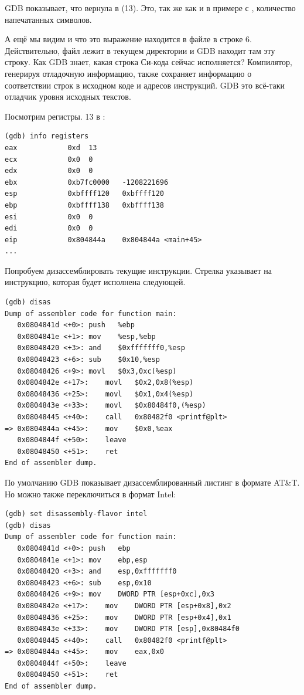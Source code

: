 \ac{GDB} показывает, что вернула \printf в \EAX (13).
Это, так же как и в примере с \olly, количество напечатанных символов.

А ещё мы видим  и что это выражение находится в файле  в строке 6.
Действительно, файл  лежит в текущем директории и \ac{GDB} находит там эту строку.
Как \ac{GDB} знает, какая строка Си-кода сейчас исполняется?
Компилятор, генерируя отладочную информацию, также сохраняет информацию о соответствии строк в исходном коде и адресов инструкций.
GDB это всё-таки отладчик уровня исходных текстов.

Посмотрим регистры.
13 в \EAX:

\begin{lstlisting}
(gdb) info registers
eax            0xd	13
ecx            0x0	0
edx            0x0	0
ebx            0xb7fc0000	-1208221696
esp            0xbffff120	0xbffff120
ebp            0xbffff138	0xbffff138
esi            0x0	0
edi            0x0	0
eip            0x804844a	0x804844a <main+45>
...
\end{lstlisting}

Попробуем дизассемблировать текущие инструкции.
Стрелка указывает на инструкцию, которая будет исполнена следующей.

\begin{lstlisting}
(gdb) disas
Dump of assembler code for function main:
   0x0804841d <+0>:	push   %ebp
   0x0804841e <+1>:	mov    %esp,%ebp
   0x08048420 <+3>:	and    $0xfffffff0,%esp
   0x08048423 <+6>:	sub    $0x10,%esp
   0x08048426 <+9>:	movl   $0x3,0xc(%esp)
   0x0804842e <+17>:	movl   $0x2,0x8(%esp)
   0x08048436 <+25>:	movl   $0x1,0x4(%esp)
   0x0804843e <+33>:	movl   $0x80484f0,(%esp)
   0x08048445 <+40>:	call   0x80482f0 <printf@plt>
=> 0x0804844a <+45>:	mov    $0x0,%eax
   0x0804844f <+50>:	leave  
   0x08048450 <+51>:	ret    
End of assembler dump.
\end{lstlisting}

По умолчанию \ac{GDB} показывает дизассемблированный листинг в формате AT\&T.
Но можно также переключиться в формат Intel:

\begin{lstlisting}
(gdb) set disassembly-flavor intel
(gdb) disas
Dump of assembler code for function main:
   0x0804841d <+0>:	push   ebp
   0x0804841e <+1>:	mov    ebp,esp
   0x08048420 <+3>:	and    esp,0xfffffff0
   0x08048423 <+6>:	sub    esp,0x10
   0x08048426 <+9>:	mov    DWORD PTR [esp+0xc],0x3
   0x0804842e <+17>:	mov    DWORD PTR [esp+0x8],0x2
   0x08048436 <+25>:	mov    DWORD PTR [esp+0x4],0x1
   0x0804843e <+33>:	mov    DWORD PTR [esp],0x80484f0
   0x08048445 <+40>:	call   0x80482f0 <printf@plt>
=> 0x0804844a <+45>:	mov    eax,0x0
   0x0804844f <+50>:	leave  
   0x08048450 <+51>:	ret    
End of assembler dump.
\end{lstlisting}

